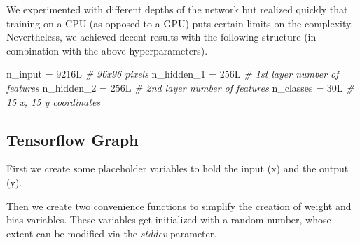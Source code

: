 \documentclass[]{article}
\newenvironment{Shaded}{\begin{snugshade}}{\end{snugshade}}
\newcommand{\KeywordTok}[1]{\textcolor[rgb]{0.13,0.29,0.53}{\textbf{{#1}}}}
\newcommand{\DataTypeTok}[1]{\textcolor[rgb]{0.13,0.29,0.53}{{#1}}}
\newcommand{\FloatTok}[1]{\textcolor[rgb]{0.00,0.00,0.81}{{#1}}}
\newcommand{\StringTok}[1]{\textcolor[rgb]{0.31,0.60,0.02}{{#1}}}
\newcommand{\CommentTok}[1]{\textcolor[rgb]{0.56,0.35,0.01}{\textit{{#1}}}}
\newcommand{\OtherTok}[1]{\textcolor[rgb]{0.56,0.35,0.01}{{#1}}}
\newcommand{\NormalTok}[1]{{#1}}
\begin{document}
We experimented with different depths of the network but realized
quickly that training on a CPU (as opposed to a GPU) puts certain limits
on the complexity. Nevertheless, we achieved decent results with the
following structure (in combination with the above hyperparameters).

\begin{Shaded}
\begin{Highlighting}[]
\NormalTok{n_input =}\StringTok{ }\NormalTok{9216L }\CommentTok{# 96x96 pixels}
\NormalTok{n_hidden_1 =}\StringTok{ }\NormalTok{256L }\CommentTok{# 1st layer number of features}
\NormalTok{n_hidden_2 =}\StringTok{ }\NormalTok{256L }\CommentTok{# 2nd layer number of features}
\NormalTok{n_classes =}\StringTok{ }\NormalTok{30L }\CommentTok{# 15 x, 15 y coordinates}
\end{Highlighting}
\end{Shaded}

\subsection{Tensorflow Graph}\label{tensorflow-graph}

First we create some placeholder variables to hold the input (x) and the
output (y).

\begin{Shaded}
\end{Shaded}

Then we create two convenience functions to simplify the creation of
weight and bias variables. These variables get initialized with a random
number, whose extent can be modified via the \emph{stddev} parameter.

\begin{Shaded}
\end{Shaded}
\end{document}
